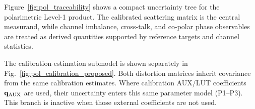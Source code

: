 Figure~\ref{fig:pol_traceability} shows a compact uncertainty tree for the
polarimetric Level-1 product. The calibrated scattering matrix is the central
measurand, while channel imbalance, cross-talk, and co-polar phase observables
are treated as derived quantities supported by reference targets and channel statistics.


The calibration-estimation submodel is shown separately in Fig.~\ref{fig:pol_calibration_proposed}. Both distortion matrices inherit covariance from the same calibration estimates.
Where calibration AUX/LUT coefficients $\mathbf q_{\rm AUX}$ are used, their
uncertainty enters this same parameter model (P1--P3). This branch is inactive when those external coefficients are not used.








